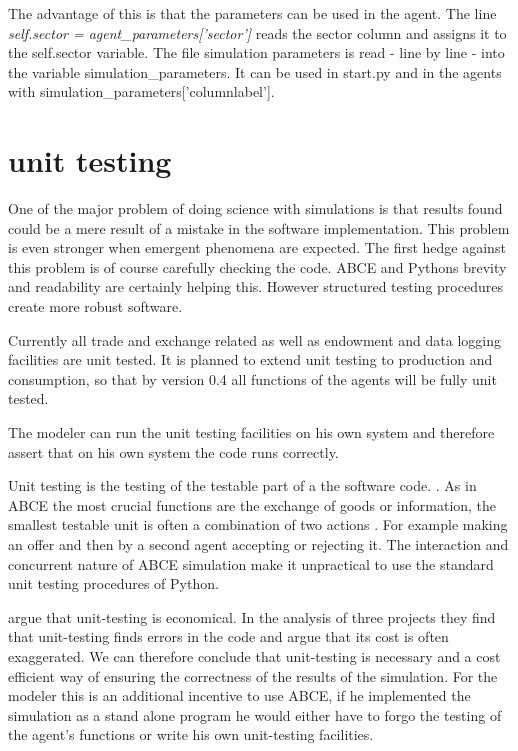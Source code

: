 \documentclass[letterpaper,10pt,english]{sphinxmanual}
\begin{document}
The advantage of this is that the parameters can be used in the agent.
The line \emph{self.sector = agent\_parameters{[}'sector'{]}} reads the sector
column and assigns it to the self.sector variable. The file simulation
parameters is read - line by line - into the variable simulation\_parameters.
It can be used in start.py and in the agents with
simulation\_parameters{[}'columnlabel'{]}.


\chapter{unit testing}
\label{unit_testing:unit-testing}\label{unit_testing::doc}
One of the major problem of doing science with simulations is that
results found could be a mere result of a mistake in the software
implementation. This problem is even stronger when emergent phenomena
are expected. The first hedge against this problem is of course
carefully checking the code. ABCE and Pythons brevity  and readability
are certainly helping this. However structured testing procedures
create more robust software.

Currently all trade and exchange related as well as endowment and
data logging facilities are unit tested. It is planned to extend
unit testing to production and consumption, so that by version 0.4
all functions of the agents will be fully unit tested.

The modeler can run the unit testing facilities on his own system and therefore
assert that on his own system the code runs correctly.

Unit testing is the testing of the testable part of a the software code.
\cite{Xie2007}. As in ABCE the most crucial functions are
the exchange of goods or information, the smallest testable unit is often
a combination of two actions \cite{Aniche}. For example making an offer and then by
a second agent accepting or rejecting it. The interaction and concurrent
nature of ABCE simulation make it unpractical to use the standard unit
testing procedures of Python.

\cite{Ellims2006} argue that unit-testing is economical. In
the analysis of three projects they find that unit-testing finds errors
in the code and argue that its cost is often exaggerated. We can
therefore conclude that unit-testing is necessary and a cost efficient
way of ensuring the correctness of the results of the simulation. For
the modeler this is an additional incentive to use ABCE, if he
implemented the simulation as a stand alone program he would either have
to forgo the testing of the agent's functions or write his own unit-testing
facilities.
\end{document}
